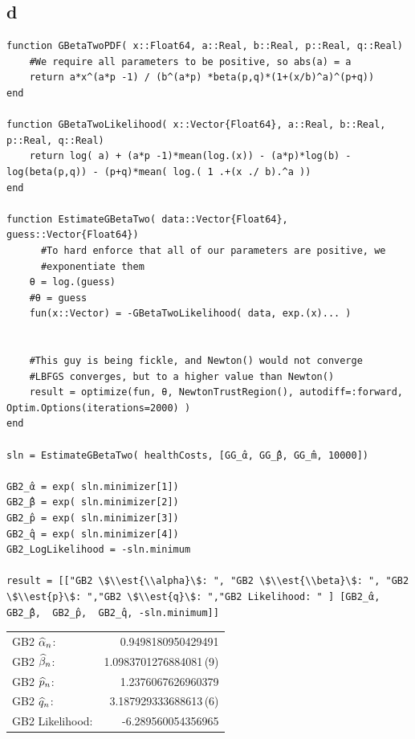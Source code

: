 \documentclass[12pt, letterpaper]{paper}
\begin{document}
\subsection{d}
\label{sec:orgaf92f24}
\begin{verbatim}
function GBetaTwoPDF( x::Float64, a::Real, b::Real, p::Real, q::Real)
    #We require all parameters to be positive, so abs(a) = a
    return a*x^(a*p -1) / (b^(a*p) *beta(p,q)*(1+(x/b)^a)^(p+q))
end

function GBetaTwoLikelihood( x::Vector{Float64}, a::Real, b::Real, p::Real, q::Real)
    return log( a) + (a*p -1)*mean(log.(x)) - (a*p)*log(b) - log(beta(p,q)) - (p+q)*mean( log.( 1 .+(x ./ b).^a ))
end

function EstimateGBetaTwo( data::Vector{Float64}, guess::Vector{Float64})
      #To hard enforce that all of our parameters are positive, we
      #exponentiate them
    θ = log.(guess)
    #θ = guess
    fun(x::Vector) = -GBetaTwoLikelihood( data, exp.(x)... )


    #This guy is being fickle, and Newton() would not converge
    #LBFGS converges, but to a higher value than Newton()
    result = optimize(fun, θ, NewtonTrustRegion(), autodiff=:forward, Optim.Options(iterations=2000) )
end

sln = EstimateGBetaTwo( healthCosts, [GG_̂α, GG_̂β, GG_̂m, 10000])

GB2_̂α = exp( sln.minimizer[1])
GB2_̂β = exp( sln.minimizer[2])
GB2_̂p = exp( sln.minimizer[3])
GB2_̂q = exp( sln.minimizer[4])
GB2_LogLikelihood = -sln.minimum

result = [["GB2 \$\\est{\\alpha}\$: ", "GB2 \$\\est{\\beta}\$: ", "GB2 \$\\est{p}\$: ","GB2 \$\\est{q}\$: ","GB2 Likelihood: " ] [GB2_̂α, GB2_̂β,  GB2_̂p,  GB2_̂q, -sln.minimum]]
\end{verbatim}

\begin{center}
\begin{tabular}{lr}
GB2 \(\widehat{ \alpha }_{n}\): & 0.9498180950429491\\
GB2 \(\widehat{ \beta }_{n}\): & 1.0983701276884081\,(9)\\
GB2 \(\widehat{ p }_{n}\): & 1.2376067626960379\\
GB2 \(\widehat{ q }_{n}\): & 3.187929333688613\,(6)\\
GB2 Likelihood: & -6.289560054356965\\
\end{tabular}
\end{center}
\end{document}
